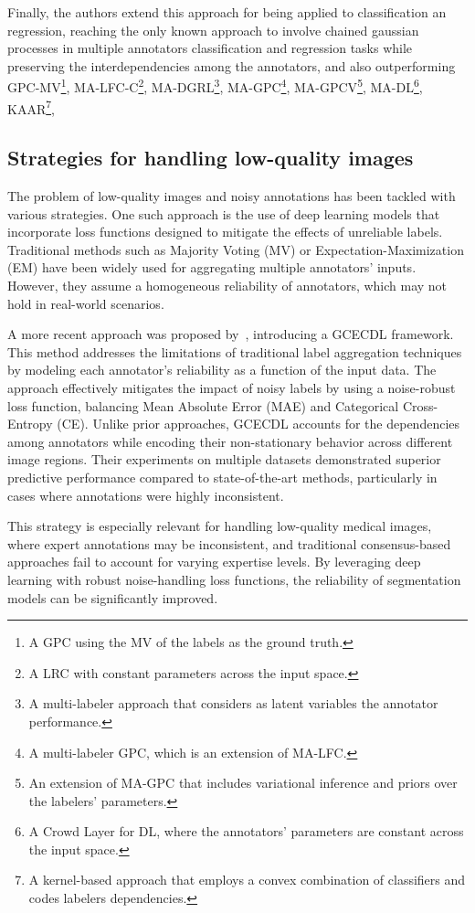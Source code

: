 Finally, the authors extend this approach for being applied to
classification an regression, reaching the only known approach to
involve chained gaussian processes in multiple annotators
classification and regression tasks while preserving the
interdependencies among the annotators, and also outperforming
GPC-MV\footnote{A GPC using the MV of the labels as the ground truth.},
MA-LFC-C\footnote{A LRC with constant parameters across the input space.},
MA-DGRL\footnote{A multi-labeler approach that considers as latent
variables the annotator performance.},
MA-GPC\footnote{A multi-labeler GPC, which is an extension of MA-LFC.},
MA-GPCV\footnote{An extension of MA-GPC that includes variational
inference and priors over the labelers’ parameters.},
MA-DL\footnote{A Crowd Layer for DL, where the annotators’ parameters
are constant across the input space.},
KAAR\footnote{A kernel-based approach that employs a convex
combination of classifiers and codes labelers dependencies.},

\subsection{Strategies for handling low-quality images}

The problem of low-quality images and noisy annotations has been
tackled with various strategies. One such approach is the use of deep
learning models that incorporate loss functions designed to mitigate
the effects of unreliable labels. Traditional methods such as
Majority Voting (MV) or Expectation-Maximization (EM) have been
widely used for aggregating multiple annotators' inputs. However,
they assume a homogeneous reliability of annotators, which may not
hold in real-world scenarios.

A more recent approach was proposed by~\cite{TrianaEtAl2023},
introducing a \gls{GCECDL} framework. This method addresses the limitations of
traditional label aggregation techniques by modeling each annotator's
reliability as a function of the input data. The approach effectively
mitigates the impact of noisy labels by using a noise-robust loss
function, balancing Mean Absolute Error (MAE) and Categorical
Cross-Entropy (CE). Unlike prior approaches, \gls{GCECDL} accounts for the
dependencies among annotators while encoding their non-stationary
behavior across different image regions. Their experiments on
multiple datasets demonstrated superior predictive performance
compared to state-of-the-art methods, particularly in cases where
annotations were highly inconsistent.

This strategy is especially relevant for handling low-quality medical
images, where expert annotations may be inconsistent, and traditional
consensus-based approaches fail to account for varying expertise
levels. By leveraging deep learning with robust noise-handling loss
functions, the reliability of segmentation models can be significantly improved.

